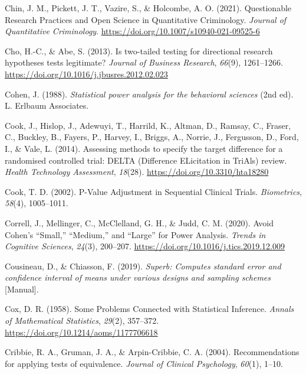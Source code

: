 \documentclass[
  letterpaper,
  DIV=11,
  numbers=noendperiod]{scrreprt}
\newlength{\cslhangindent}
\newlength{\cslentryspacingunit} %
\newenvironment{CSLReferences}[2] %
 {%
  \setlength{\parindent}{0pt}
  \ifodd #1
  \let\oldpar\par
  \def\par{\hangindent=\cslhangindent\oldpar}
  \fi
  \setlength{\parskip}{#2\cslentryspacingunit}
 }%
 {}
\begin{document}
\begin{CSLReferences}{1}{0}
\leavevmode{}%
Chin, J. M., Pickett, J. T., Vazire, S., \& Holcombe, A. O. (2021).
Questionable {Research Practices} and {Open Science} in {Quantitative
Criminology}. \emph{Journal of Quantitative Criminology}.
\url{https://doi.org/10.1007/s10940-021-09525-6}

\leavevmode{}%
Cho, H.-C., \& Abe, S. (2013). Is two-tailed testing for directional
research hypotheses tests legitimate? \emph{Journal of Business
Research}, \emph{66}(9), 1261--1266.
\url{https://doi.org/10.1016/j.jbusres.2012.02.023}

\leavevmode{}%
Cohen, J. (1988). \emph{Statistical power analysis for the behavioral
sciences} (2nd ed). {L. Erlbaum Associates}.

\leavevmode{}%
Cook, J., Hislop, J., Adewuyi, T., Harrild, K., Altman, D., Ramsay, C.,
Fraser, C., Buckley, B., Fayers, P., Harvey, I., Briggs, A., Norrie, J.,
Fergusson, D., Ford, I., \& Vale, L. (2014). Assessing methods to
specify the target difference for a randomised controlled trial: {DELTA}
({Difference ELicitation} in {TriAls}) review. \emph{Health Technology
Assessment}, \emph{18}(28). \url{https://doi.org/10.3310/hta18280}

\leavevmode{}%
Cook, T. D. (2002). P-{Value Adjustment} in {Sequential Clinical
Trials}. \emph{Biometrics}, \emph{58}(4), 1005--1011.

\leavevmode{}%
Correll, J., Mellinger, C., McClelland, G. H., \& Judd, C. M. (2020).
Avoid {Cohen}'s {``{Small},''} {``{Medium},''} and {``{Large}''} for
{Power Analysis}. \emph{Trends in Cognitive Sciences}, \emph{24}(3),
200--207. \url{https://doi.org/10.1016/j.tics.2019.12.009}

\leavevmode{}%
Cousineau, D., \& Chiasson, F. (2019). \emph{Superb: {Computes} standard
error and confidence interval of means under various designs and
sampling schemes} {[}Manual{]}.

\leavevmode{}%
Cox, D. R. (1958). Some {Problems Connected} with {Statistical
Inference}. \emph{Annals of Mathematical Statistics}, \emph{29}(2),
357--372. \url{https://doi.org/10.1214/aoms/1177706618}

\leavevmode{}%
Cribbie, R. A., Gruman, J. A., \& Arpin-Cribbie, C. A. (2004).
Recommendations for applying tests of equivalence. \emph{Journal of
Clinical Psychology}, \emph{60}(1), 1--10.


\end{CSLReferences}
\end{document}
